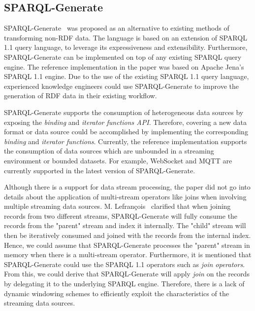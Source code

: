 \subsection{SPARQL-Generate}
SPARQL-Generate~\cite{sparql_generate} was proposed as an alternative to existing methods of 
transforming non-RDF data. The language is based on an extension of SPARQL 1.1 query language, to leverage 
its expressiveness and extensibility. Furthermore, SPARQL-Generate can be implemented on top 
of any existing SPARQL query engine. The reference implementation in the paper was based on Apache Jena's 
SPARQL 1.1 engine. Due to the use of the existing SPARQL 1.1 query language, experienced knowledge engineers could use 
SPARQL-Generate to improve the generation of RDF data in their existing workflow. 

SPARQL-Generate supports the consumption of heterogeneous data sources by exposing the 
\emph{binding} and \emph{iterator functions API}. Therefore, covering a new data format or data source could be accomplished 
by implementing the corresponding \emph{binding} and \emph{iterator functions}. Currently, 
the reference implementation supports the consumption of data sources which are unbounded in a 
streaming environment or bounded datasets. 
For example, WebSocket and MQTT are currently supported in the latest version of SPARQL-Generate. 

Although there is a support for data stream processing, the paper did not go into details 
about the application of multi-stream operators like joins when involving multiple streaming 
data sources. M. Lefran\c{c}ois~\cite{sparql_generate} clarified that when joining
records from two different streams, SPARQL-Generate will fully consume the records 
from the "parent" stream and index it internally. The "child" stream will then be iteratively consumed and 
joined with the records from the internal index. Hence, we could assume that SPARQL-Generate processes the "parent" 
stream in memory when there is a multi-stream operator.
Furthermore, it is mentioned that SPARQL-Generate could use the SPARQL 1.1 operators such as \emph{join operators}. 
From this, we could derive that SPARQL-Generate will apply \emph{join} on the 
records by delegating it to the underlying SPARQL engine.
Therefore, there is a lack of  
dynamic windowing schemes to efficiently exploit the characteristics of the streaming data sources.  


